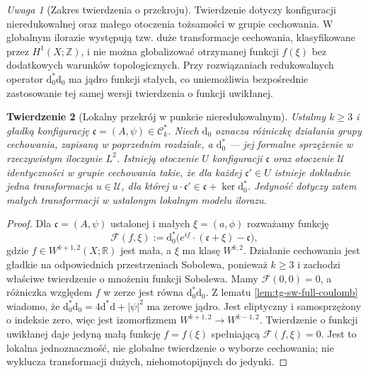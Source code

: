 \documentclass[11pt,a4paper]{report}
\numberwithin{equation}{section}
\theoremstyle{plain}
\newtheorem{twierdzenie}{Twierdzenie}[section]
\theoremstyle{definition}
\theoremstyle{remark}
\newtheorem{uwaga}[twierdzenie]{Uwaga}
\begin{document}
\begin{uwaga}[Zakres twierdzenia o przekroju]
Twierdzenie dotyczy konfiguracji nieredukowalnej oraz
małego otoczenia tożsamości w grupie cechowania.
W globalnym ilorazie występują tzw. duże transformacje
cechowania, klasyfikowane przez $H^1(X;\mathbb Z)$,
i nie można globalizować otrzymanej funkcji $f(\xi)$
bez dodatkowych warunków topologicznych.
Przy rozwiązaniach redukowalnych operator
$\mathrm d_0^*\mathrm d_0$ ma jądro funkcji stałych,
co uniemożliwia bezpośrednie zastosowanie tej samej
wersji twierdzenia o funkcji uwikłanej.
\end{uwaga}

\begin{twierdzenie}[Lokalny przekrój w punkcie nieredukowalnym]
\label{thm:tg-sw12-slice}
Ustalmy $k\ge3$ i gładką konfigurację
$\mathfrak c=(A,\psi)\in\mathcal C_k^*$.
Niech $\mathrm d_0$ oznacza różniczkę działania grupy
cechowania, zapisaną w poprzednim rozdziale, a
$\mathrm d_0^*$ --- jej formalne sprzężenie w rzeczywistym
iloczynie $L^2$. Istnieją otoczenie $U$ konfiguracji $\mathfrak c$ oraz
otoczenie $\mathcal U$ identyczności w grupie cechowania
takie, że dla każdej $\mathfrak c'\in U$ istnieje
dokładnie jedna transformacja $u\in\mathcal U$,
dla której $u\cdot\mathfrak c'\in
\mathfrak c+\ker\mathrm d_0^*$.
Jedyność dotyczy zatem małych transformacji
w ustalonym lokalnym modelu ilorazu.
\end{twierdzenie}

\begin{proof}
Dla $\mathfrak c=(A,\psi)$ ustalonej i małych
$\xi=(a,\phi)$ rozważamy funkcję
\[
\mathcal F(f,\xi):=\mathrm d_0^*
\bigl(e^{if}\cdot(\mathfrak c+\xi)-\mathfrak c\bigr),
\]
gdzie $f\in W^{k+1,2}(X;\mathbb R)$ jest mała, a $\xi$
ma klasę $W^{k,2}$. Działanie cechowania jest gładkie
na odpowiednich przestrzeniach Sobolewa, ponieważ $k\ge3$
i zachodzi właściwe twierdzenie o mnożeniu funkcji Sobolewa.
Mamy $\mathcal F(0,0)=0$, a różniczka względem $f$
w zerze jest równa $\mathrm d_0^*\mathrm d_0$.
Z lematu \ref{lem:tg-sw-full-coulomb} wiadomo, że
$\mathrm d_0^*\mathrm d_0=4\mathrm d^*\mathrm d+|\psi|^2$
ma zerowe jądro. Jest eliptyczny i samosprzężony o indeksie
zero, więc jest izomorfizmem
$W^{k+1,2}\to W^{k-1,2}$.
Twierdzenie o funkcji uwikłanej daje jedyną małą funkcję
$f=f(\xi)$ spełniającą $\mathcal F(f,\xi)=0$.
Jest to lokalna jednoznaczność, nie globalne twierdzenie
o wyborze cechowania; nie wyklucza transformacji dużych,
niehomotopijnych do jedynki.
\end{proof}
\end{document}
